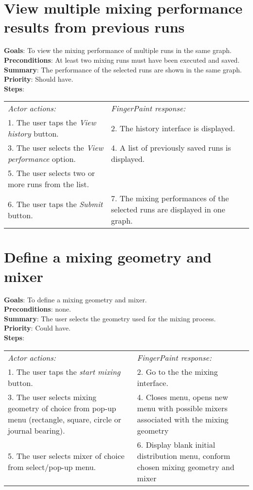 \begin{appendices}
    \section{View multiple mixing performance results from previous runs}
  \textbf{Goals}: To view the mixing performance of multiple runs in the same graph.\\
  \textbf{Preconditions}: At least two mixing runs must have been executed and saved.\\
  \textbf{Summary}: The performance of the selected runs are shown in the same graph.\\
  \textbf{Priority}: Should have.\\
  \textbf{Steps}: \\
  \begin{tabular}{ p{} p{} }
  	\emph{Actor actions:} & \emph{FingerPaint response:} \\
	   1. The user taps the \emph{View history} button. & 2. The history interface is displayed. \\
	 3. The user selects the \emph{View performance} option. & 4. A list of previously saved runs is displayed.\\
	 5. The user selects two or more runs from the list. & \\
	 6. The user taps the \emph{Submit} button. & 7. The mixing performances of the selected runs are displayed in one graph.\\
  \end{tabular}


\section{Define a mixing geometry and mixer}
  \textbf{Goals}: To define a mixing geometry and mixer.\\
  \textbf{Preconditions}: none.\\
  \textbf{Summary}: The user selects the geometry used for the mixing process.\\
  \textbf{Priority}: Could have.\\
  \textbf{Steps}: \\
  \begin{tabular}{ p{} p{} }
  	\emph{Actor actions:} & \emph{FingerPaint response:} \\
	1. The user taps the \emph{start mixing} button. & 2. Go to the the mixing interface. \\
	3. The user selects mixing geometry of choice from pop-up menu (rectangle, square, circle or journal bearing). & 4. Closes menu, opens new menu with possible mixers associated with the mixing geometry\\
	5. The user selects mixer of choice from select/pop-up menu. & 6.	Display blank initial distribution menu, conform chosen mixing geometry and mixer\\
  \end{tabular}


\end{appendices}

